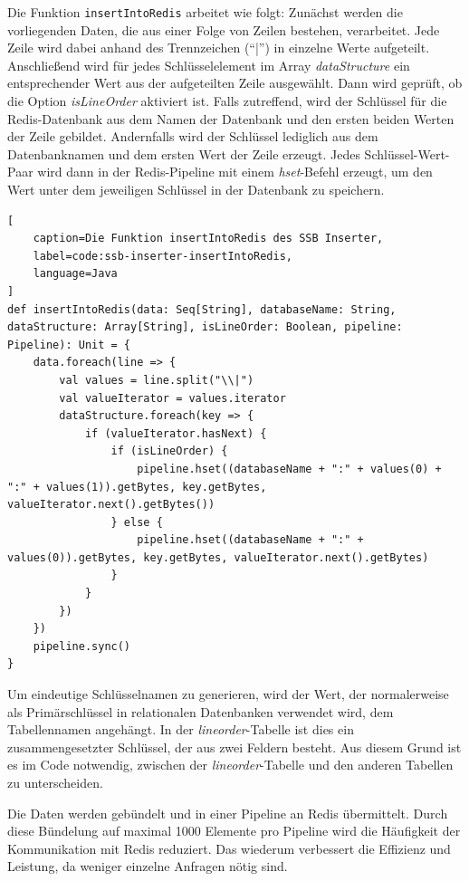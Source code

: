 Die Funktion \texttt{insertIntoRedis} arbeitet wie folgt: Zunächst werden die vorliegenden Daten, die aus einer Folge von Zeilen bestehen, verarbeitet. Jede Zeile wird dabei anhand des Trennzeichen (\enquote{|}) in einzelne Werte aufgeteilt. Anschließend wird für jedes Schlüsselelement im Array \emph{dataStructure} ein entsprechender Wert aus der aufgeteilten Zeile ausgewählt. Dann wird geprüft, ob die Option \emph{isLineOrder} aktiviert ist. Falls zutreffend, wird der Schlüssel für die Redis-Datenbank aus dem Namen der Datenbank und den ersten beiden Werten der Zeile gebildet. Andernfalls wird der Schlüssel lediglich aus dem Datenbanknamen und dem ersten Wert der Zeile erzeugt. Jedes Schlüssel-Wert-Paar wird dann in der Redis-Pipeline mit einem \emph{hset}-Befehl erzeugt, um den Wert unter dem jeweiligen Schlüssel in der Datenbank zu speichern.

\begin{lstlisting}[
    caption=Die Funktion insertIntoRedis des SSB Inserter,
    label=code:ssb-inserter-insertIntoRedis,
    language=Java
]
def insertIntoRedis(data: Seq[String], databaseName: String, dataStructure: Array[String], isLineOrder: Boolean, pipeline: Pipeline): Unit = {
	data.foreach(line => {
		val values = line.split("\\|")
		val valueIterator = values.iterator
		dataStructure.foreach(key => {
			if (valueIterator.hasNext) {
				if (isLineOrder) {
					pipeline.hset((databaseName + ":" + values(0) + ":" + values(1)).getBytes, key.getBytes, valueIterator.next().getBytes())
				} else {
					pipeline.hset((databaseName + ":" + values(0)).getBytes, key.getBytes, valueIterator.next().getBytes)
				}
			}
		})
	})
	pipeline.sync()
}
\end{lstlisting}

Um eindeutige Schlüsselnamen zu generieren, wird der Wert, der normalerweise als Primärschlüssel in relationalen Datenbanken verwendet wird, dem Tabellennamen angehängt. In der \emph{lineorder}-Tabelle ist dies ein zusammengesetzter Schlüssel, der aus zwei Feldern besteht. Aus diesem Grund ist es im Code notwendig, zwischen der \emph{lineorder}-Tabelle und den anderen Tabellen zu unterscheiden.

Die Daten werden gebündelt und in einer Pipeline an Redis übermittelt. Durch diese Bündelung auf maximal 1000 Elemente pro Pipeline wird die Häufigkeit der Kommunikation mit Redis reduziert. Das wiederum verbessert die Effizienz und Leistung, da weniger einzelne Anfragen nötig sind.



